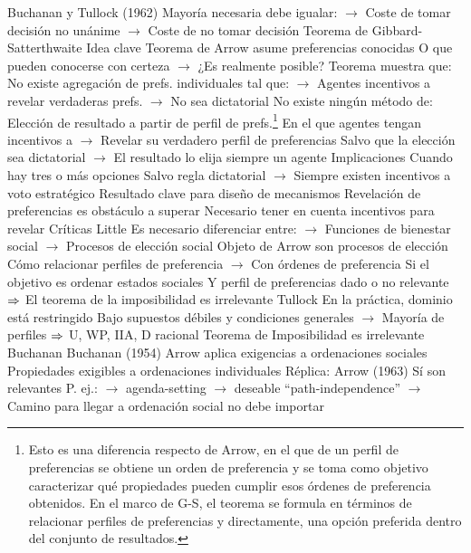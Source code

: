 \documentclass{nuevotema}
\begin{document}
\begin{esquemal}
				\4 Buchanan y Tullock (1962)
				\4[] Mayoría necesaria debe igualar:
				\4[] $\to$ Coste de tomar decisión no unánime
				\4[] $\to$ Coste de no tomar decisión
		\2 Teorema de Gibbard-Satterthwaite
			\3 Idea clave
				\4 Teorema de Arrow asume preferencias conocidas
				\4[] O que pueden conocerse con certeza
				\4[] $\to$ ¿Es realmente posible?
				\4 Teorema muestra que:
				\4[] No existe agregación de prefs. individuales tal que:
				\4[] $\to$ Agentes incentivos a revelar verdaderas prefs.
				\4[] $\to$ No sea dictatorial
				\4 No existe ningún método de:
				\4[] Elección de resultado a partir de perfil de prefs.\footnote{Esto es una diferencia respecto de Arrow, en el que de un perfil de preferencias se obtiene un orden de preferencia y se toma como objetivo caracterizar qué propiedades pueden cumplir esos órdenes de preferencia obtenidos. En el marco de G-S, el teorema se formula en términos de relacionar perfiles de preferencias y directamente, una opción preferida dentro del conjunto de resultados.}
				\4[] En el que agentes tengan incentivos a
				\4[] $\to$ Revelar su verdadero perfil de preferencias
				\4[] Salvo que la elección sea dictatorial
				\4[] $\to$ El resultado lo elija siempre un agente
			\3 Implicaciones
				\4 Cuando hay tres o más opciones
				\4[] Salvo regla dictatorial
				\4[] $\to$ Siempre existen incentivos a voto estratégico
				\4 Resultado clave para diseño de mecanismos
				\4[] Revelación de preferencias es obstáculo a superar
				\4[] Necesario tener en cuenta incentivos para revelar
		\2 Críticas
			\3 Little
				\4 Es necesario diferenciar entre:
				\4[] $\to$ Funciones de bienestar social
				\4[] $\to$ Procesos de elección social
				\4 Objeto de Arrow son procesos de elección
				\4[] Cómo relacionar perfiles de preferencia
				\4[] $\to$ Con órdenes de preferencia
				\4 Si el objetivo es ordenar estados sociales
				\4[] Y perfil de preferencias dado o no relevante
				\4[] $\then$ El teorema de la imposibilidad es irrelevante
			\3 Tullock
				\4 En la práctica, dominio está restringido
				\4[] Bajo supuestos débiles y condiciones generales
				\4[] $\to$ Mayoría de perfiles $\then$ U, WP, IIA, D racional
				\4[$\then$] Teorema de Imposibilidad es irrelevante
			\3 Buchanan
				\4 Buchanan (1954)
				\4[] Arrow aplica exigencias a ordenaciones sociales
				\4[] Propiedades exigibles a ordenaciones individuales
				\4 Réplica: Arrow (1963)
				\4[] Sí son relevantes
				\4[] P. ej.:
				\4[] $\to$ agenda-setting $\to$ deseable ``path-independence''
				\4[] $\to$ Camino para llegar a ordenación social no debe importar

\end{esquemal}
\end{document}
